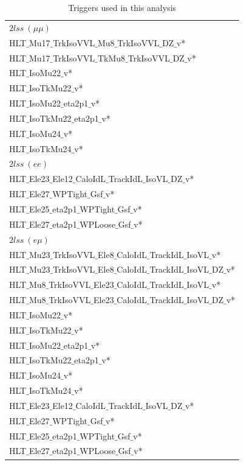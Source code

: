 \begin{longtable}{l}
\small
\caption[TRIGGER LIST]{Triggers used in this analysis\label{tab:triggers}}\\
\hline
$2lss~(\mu\mu)$ \\
\hline
HLT$\_$Mu17$\_$TrkIsoVVL$\_$Mu8$\_$TrkIsoVVL$\_$DZ$\_$v* \\
HLT$\_$Mu17$\_$TrkIsoVVL$\_$TkMu8$\_$TrkIsoVVL$\_$DZ$\_$v* \\
HLT$\_$IsoMu22$\_$v* \\
HLT$\_$IsoTkMu22$\_$v* \\
HLT$\_$IsoMu22$\_$eta2p1$\_$v* \\
HLT$\_$IsoTkMu22$\_$eta2p1$\_$v* \\
HLT$\_$IsoMu24$\_$v* \\
HLT$\_$IsoTkMu24$\_$v* \\
\hline
\hline
$2lss~(ee)$ \\
\hline
HLT$\_$Ele23$\_$Ele12$\_$CaloIdL$\_$TrackIdL$\_$IsoVL$\_$DZ$\_$v* \\
HLT$\_$Ele27$\_$WPTight$\_$Gsf$\_$v* \\
HLT$\_$Ele25$\_$eta2p1$\_$WPTight$\_$Gsf$\_$v* \\
HLT$\_$Ele27$\_$eta2p1$\_$WPLoose$\_$Gsf$\_$v* \\
\hline
\hline
$2lss~(e\mu)$ \\
\hline
HLT$\_$Mu23$\_$TrkIsoVVL$\_$Ele8$\_$CaloIdL$\_$TrackIdL$\_$IsoVL$\_$v* \\
HLT$\_$Mu23$\_$TrkIsoVVL$\_$Ele8$\_$CaloIdL$\_$TrackIdL$\_$IsoVL$\_$DZ$\_$v* \\
HLT$\_$Mu8$\_$TrkIsoVVL$\_$Ele23$\_$CaloIdL$\_$TrackIdL$\_$IsoVL$\_$v* \\
HLT$\_$Mu8$\_$TrkIsoVVL$\_$Ele23$\_$CaloIdL$\_$TrackIdL$\_$IsoVL$\_$DZ$\_$v* \\
HLT$\_$IsoMu22$\_$v* \\
HLT$\_$IsoTkMu22$\_$v* \\
HLT$\_$IsoMu22$\_$eta2p1$\_$v* \\
HLT$\_$IsoTkMu22$\_$eta2p1$\_$v* \\
HLT$\_$IsoMu24$\_$v* \\
HLT$\_$IsoTkMu24$\_$v* \\
HLT$\_$Ele23$\_$Ele12$\_$CaloIdL$\_$TrackIdL$\_$IsoVL$\_$DZ$\_$v* \\
HLT$\_$Ele27$\_$WPTight$\_$Gsf$\_$v* \\
HLT$\_$Ele25$\_$eta2p1$\_$WPTight$\_$Gsf$\_$v* \\
HLT$\_$Ele27$\_$eta2p1$\_$WPLoose$\_$Gsf$\_$v* \\
\hline
\end{longtable}

